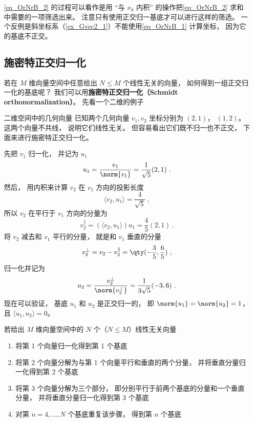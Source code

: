 \autoref{eq_OrNrB_2} 的过程可以看作是用 “与 $x_k$ 内积” 的操作把\autoref{eq_OrNrB_2} 求和中需要的一项筛选出来。 注意只有使用正交归一基底才可以进行这样的筛选。 一个反例是斜坐标系（\autoref{ex_Gvec2_1}）不能使用\autoref{eq_OrNrB_1} 计算坐标， 因为它的基底不正交。


\subsection{施密特正交归一化}\label{sub_OrNrB_1}


若在 $M$ 维向量空间中任意给出 $N \leqslant M$ 个线性无关的向量， 如何得到一组正交归一化的基底呢？ 我们可以用\textbf{施密特正交归一化（Schmidt orthonormalization）}。 先看一个二维的例子

\begin{example}{二维空间中的几何向量}
已知两个几何向量 $v_1, v_2$ 坐标分别为 $(2, 1)$， $(1, 2)$。 这两个向量不共线， 说明它们线性无关。 但容易看出它们既不归一也不正交， 下面来进行施密特正交归一化。

先把 $v_1$ 归一化， 并记为 $u_1$
\begin{equation}
u_1 = \frac{v_1}{\norm{v_1}} = \frac{1}{\sqrt{5}} (2, 1)~.
\end{equation}
然后， 用内积来计算 $v_2$ 在 $v_1$ 方向的投影长度
\begin{equation}
\langle v_2, u_1 \rangle = \frac{4}{\sqrt{5}}~,
\end{equation}
所以 $v_2$ 在平行于 $v_1$ 方向的分量为
\begin{equation}
v_2^\parallel = (\langle v_2, u_1 \rangle)u_1 = \frac{4}{5} (2, 1)~.
\end{equation}
将 $v_2$ 减去和 $v_1$ 平行的分量， 就是和 $v_1$ 垂直的分量
\begin{equation}
v_2^\bot = v_2 - v_2^\parallel = \qty(-\frac35, \frac65)~,
\end{equation}
归一化并记为
\begin{equation}
u_2 = \frac{v_2^\bot}{\norm{v_2^\bot}} = \frac{1}{3\sqrt{5}} (-3, 6)~.
\end{equation}
现在可以验证， 基底 $u_1$ 和 $u_2$ 是正交归一的， 即 $\norm{u_1} = \norm{u_2} = 1$， 且 $\langle u_1, u_2 \rangle = 0$。
\end{example}

若给出 $M$ 维向量空间中的 $N$ 个（$N \leqslant M$）线性无关向量
\begin{enumerate}
\item 将第 1 个向量归一化得到第 1 个基底
\item 将第 2 个向量分解为与第 1 个向量平行和垂直的两个分量， 并将垂直分量归一化得到第 2 个基底
\item 将第 3 个向量分解为三个部分， 即分别平行于前两个基底的分量和一个垂直分量， 并将垂直分量归一化得到第 3 个基底
\item 对第 $n = 4, \dots , N$ 个基底重复该步骤， 得到第 $n$ 个基底
\end{enumerate}

